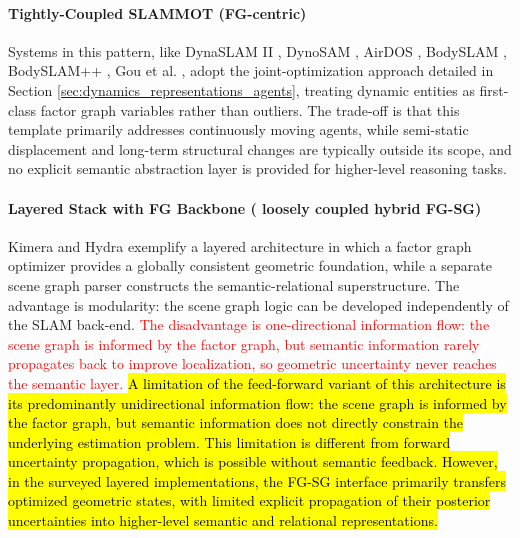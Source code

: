 \paragraph{Tightly-Coupled SLAMMOT (FG-centric)}
Systems in this pattern, like DynaSLAM II \cite{bescos_dynaslam_2021}, DynoSAM \cite{morris_dynosam_2025}, AirDOS \cite{qiu2022airdos}, BodySLAM \cite{henning_bodyslam_2022}, BodySLAM++ \cite{henning_bodyslam_2023}, Gou et al. \cite{gou_visual_2024}, adopt the joint-optimization approach detailed in Section \ref{sec:dynamics_representations_agents}, treating dynamic entities as first-class factor graph variables rather than outliers.%
The trade-off is that this template primarily addresses continuously moving agents, while semi-static displacement and long-term structural changes are typically outside its scope, and no explicit semantic abstraction layer is provided for higher-level reasoning tasks.

\paragraph{Layered Stack with FG Backbone ( loosely coupled hybrid FG-SG)}
Kimera \cite{rosinol_kimera_2021} and Hydra \cite{hughes_hydra_2022} exemplify a layered architecture in which a factor graph optimizer provides a globally consistent geometric foundation, while a separate scene graph parser constructs the semantic-relational superstructure. 
The advantage is modularity: the scene graph logic can be developed independently of the SLAM back-end. 
\textcolor{red}{The disadvantage is one-directional information flow: the scene graph is informed by the factor graph, but semantic information rarely propagates back to improve localization, so geometric uncertainty never reaches the semantic layer.}
\hl{A limitation of the feed-forward variant of this architecture is its predominantly unidirectional information flow: the scene graph is informed by the factor graph, but semantic information does not directly constrain the underlying estimation problem. This limitation is different from forward uncertainty propagation, which is possible without semantic feedback. However, in the surveyed layered implementations, the FG-SG interface primarily transfers optimized geometric states, with limited explicit propagation of their posterior uncertainties into higher-level semantic and relational representations.}


